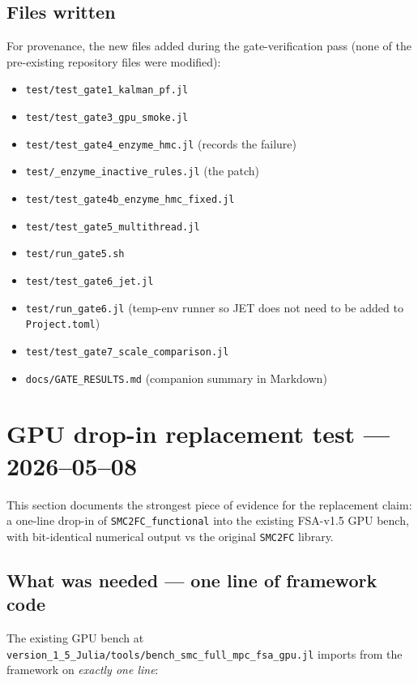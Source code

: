 \documentclass[11pt,a4paper]{article}
\begin{document}
\subsection{Files written}
For provenance, the new files added during the gate-verification pass
(none of the pre-existing repository files were modified):

\begin{itemize}[leftmargin=*]
\item \texttt{test/test\_gate1\_kalman\_pf.jl}
\item \texttt{test/test\_gate3\_gpu\_smoke.jl}
\item \texttt{test/test\_gate4\_enzyme\_hmc.jl} (records the failure)
\item \texttt{test/\_enzyme\_inactive\_rules.jl} (the patch)
\item \texttt{test/test\_gate4b\_enzyme\_hmc\_fixed.jl}
\item \texttt{test/test\_gate5\_multithread.jl}
\item \texttt{test/run\_gate5.sh}
\item \texttt{test/test\_gate6\_jet.jl}
\item \texttt{test/run\_gate6.jl} (temp-env runner so JET does not need
    to be added to \texttt{Project.toml})
\item \texttt{test/test\_gate7\_scale\_comparison.jl}
\item \texttt{docs/GATE\_RESULTS.md} (companion summary in Markdown)
\end{itemize}

\section{GPU drop-in replacement test --- 2026--05--08}
\label{sec:gpu_dropin}

This section documents the strongest piece of evidence for the
replacement claim: a one-line drop-in of \texttt{SMC2FC\_functional}
into the existing FSA-v1.5 GPU bench, with bit-identical numerical
output vs the original \texttt{SMC2FC} library.

\subsection{What was needed --- one line of framework code}

The existing GPU bench at
\texttt{version\_1\_5\_Julia/tools/bench\_smc\_full\_mpc\_fsa\_gpu.jl}
imports from the framework on \emph{exactly one line}:
\end{document}
